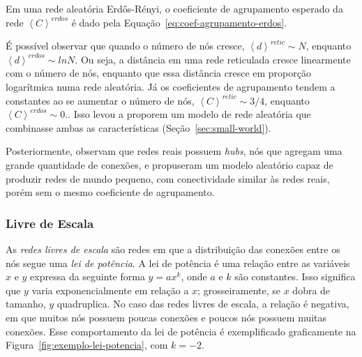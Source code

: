 \documentclass[12pt,a4paper]{article}
\theoremstyle{hypo}
\newcommand{\avg}[1]{\left\langle #1 \right\rangle} %
\begin{document}
Em uma rede aleatória Erdős-Rényi, o coeficiente de agrupamento esperado da rede $\avg{C}^\textit{erdos}$ é dado pela Equação~\ref{eq:coef-agrupamento-erdos}.

É possível observar que quando o número de nós cresce, $\avg{d}^\textit{retic} \sim N$, enquanto $\avg{d}^\textit{erdos} \sim ln N$. Ou seja, a distância em uma rede reticulada cresce linearmente com o número de nós, enquanto que essa distância cresce em proporção logarítmica numa rede aleatória. Já os coeficientes de agrupamento tendem a constantes ao se aumentar o número de nós, $\avg{C}^\textit{retic} \sim 3 / 4$, enquanto $\avg{C}^\textit{erdos} \sim 0$.. Isso levou  a proporem um modelo de rede aleatória que combinasse ambas as características (Seção~\ref{sec:small-world}).

Posteriormente,  observam que redes reais possuem \textit{hubs}, nós que agregam uma grande quantidade de conexões, e propuseram um modelo aleatório capaz de produzir redes de mundo pequeno, com conectividade similar às redes reais, porém sem o mesmo coeficiente de agrupamento.

\subsubsection{Livre de Escala} \label{sec:scale-free}

As \textit{redes livres de escala} são redes em que a distribuição das conexões entre os nós segue uma \textit{lei de potência}. A lei de potência é uma relação entre as variáveis $x$ e $y$ expressa da seguinte forma $y = ax^{k}$, onde $a$ e $k$ são constantes. Isso significa que $y$ varia exponencialmente em relação a $x$; grosseiramente, se $x$ dobra de tamanho, $y$ quadruplica. No caso das redes livres de escala, a relação é negativa, em que muitos nós possuem poucas conexões e poucos nós possuem muitas conexões. Esse comportamento da lei de potência é exemplificado graficamente na Figura~\ref{fig:exemplo-lei-potencia}, com $k = -2$.
\end{document}
